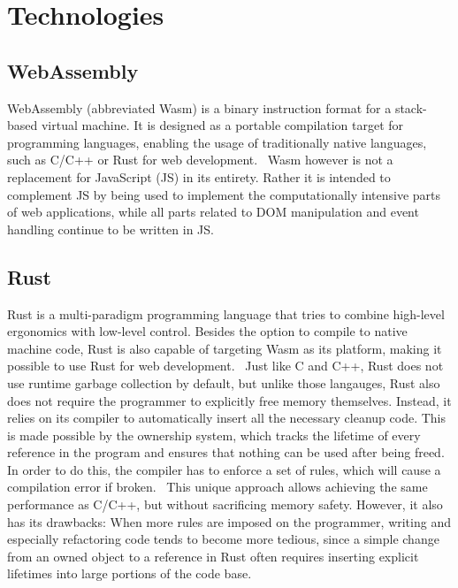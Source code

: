 \section {Technologies}

\subsection{WebAssembly}

WebAssembly (abbreviated Wasm) is a binary instruction format for a stack-based virtual machine. It is designed as a portable compilation target for programming languages, enabling the usage of traditionally native languages, such as C/C++ or Rust for web development.~\cite{wasmweb}
Wasm however is not a replacement for JavaScript (JS) in its entirety. Rather it is intended to complement JS by being used to implement the computationally intensive parts of web applications, while all parts related to DOM manipulation and event handling continue to be written in JS.~\cite{wasmmdn}

\subsection{Rust}

Rust is a multi-paradigm programming language that tries to combine high-level ergonomics with low-level control. \cite[Introduction]{klabnik2019rust}
Besides the option to compile to native machine code, Rust is also capable of targeting Wasm as its platform, making it possible to use Rust for web development.~\cite{rustwasm}
Just like C and C++, Rust does not use runtime garbage collection by default, but unlike those langauges, Rust also does not require the programmer to explicitly free memory themselves.
Instead, it relies on its compiler to automatically insert all the necessary cleanup code. This is made possible by the ownership system, which tracks the lifetime of every reference in the program and ensures that nothing can be used after being freed.
In order to do this, the compiler has to enforce a set of rules, which will cause a compilation error if broken.~\cite[Chapter~4]{klabnik2019rust}
This unique approach allows achieving the same performance as C/C++, but without sacrificing memory safety.
However, it also has its drawbacks: When more rules are imposed on the programmer, writing and especially refactoring code tends to become more tedious, since a simple change from an owned object to a reference in Rust often requires inserting explicit lifetimes into large portions of the code base.

